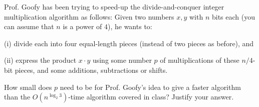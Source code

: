 \documentclass{article}
\begin{document}
\begin{problem} 
Prof. Goofy has been trying to speed-up the divide-and-conquer integer multiplication algorithm
as follows: Given two numbers $x,y$ with $n$ bits each (you can assume that $n$ is
a power of $4$), he wants to:
%
\begin{description}
	\item{(i)} divide each into four equal-length pieces (instead of two pieces as before),
and 
	\item{(ii)} express the product $x\cdot y$ using some number $p$ of
multiplications of these $n/4$-bit pieces, and some additions, subtractions or shifts.
%
\end{description}
%
How small does $p$ need to be for Prof. Goofy's idea to give a faster
algorithm than the $O(n^{\log_2{3}})$-time algorithm
covered in class? Justify your answer. 
\end{problem}


%
\end{document}
